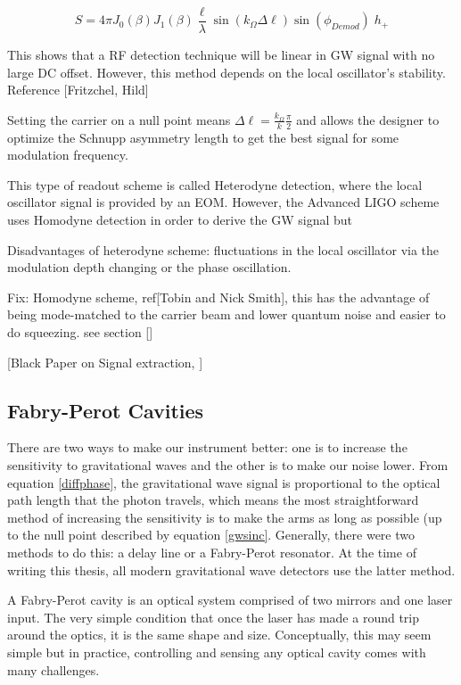 		\begin{equation}
		S = 4 \pi  J_0(\beta) J_1(\beta) \frac{\ell}{\lambda}  \sin(k_{\Omega} \Delta \ell) \sin(\phi_{Demod}) \; h_{+}
		\end{equation}
		
		This shows that a RF detection technique will be linear in GW signal with no large DC offset.  However, this method depends on the local oscillator's stability. Reference [Fritzchel, Hild] 
		
		Setting the carrier on a null point means $\Delta \ell = \frac{k_{\Omega}}{k} \frac{\pi}{2}$ and allows the designer to optimize the Schnupp asymmetry length to get the best signal for some modulation frequency.
		
		This type of readout scheme is called Heterodyne detection, where the local oscillator signal is provided by an EOM.  However, the Advanced LIGO scheme uses Homodyne detection in order to derive the GW signal but 
		
		Disadvantages of heterodyne scheme: fluctuations in the local oscillator via the modulation depth changing or the phase oscillation.
		
		Fix: Homodyne scheme, ref[Tobin and Nick Smith], this has the advantage of being mode-matched to the carrier beam and lower quantum noise and easier to do squeezing. see section []
		
		
		[Black Paper on Signal extraction, ]	
	
		\subsection{Fabry-Perot Cavities}\label{FP}
		There are two ways to make our instrument better: one is to increase the sensitivity to gravitational waves and the other is to make our noise lower. From equation \ref{diffphase}, the gravitational wave signal is proportional to the optical path length that the photon travels, which means the most straightforward method of increasing the sensitivity is to make the arms as long as possible (up to the null point described by equation \ref{gwsinc}.  Generally, there were two methods to do this: a delay line or a Fabry-Perot resonator.  At the time of writing this thesis, all modern gravitational wave detectors use the latter method.
	
		A Fabry-Perot cavity is an optical system comprised of two mirrors and one laser input. The very simple condition that once the laser has made a round trip around the optics, it is the same shape and size.  Conceptually, this may seem simple but in practice, controlling and sensing any optical cavity comes with many challenges.
		
